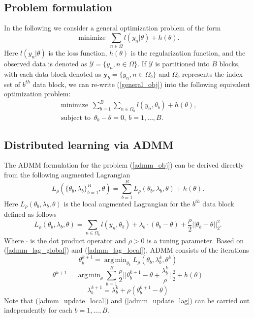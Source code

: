 \documentclass{article}
\DeclareMathOperator*{\argmin}{arg\,min}
\DeclareMathOperator*{\minimize}{minimize}
\DeclareMathOperator*{\st}{subject~to}
\newcommand{\1}[0]{\ensuremath{\boldsymbol{1}}\xspace}
\newcommand{\yv}[0]{\ensuremath{\boldsymbol{y}}\xspace}
\begin{document}
\subsection{Problem formulation}
In the following we consider a general optimization problem of the form
\begin{equation}\label{general_obj}
\minimize ~ \sum_{n\in\Omega}l(y_n|\theta) + h(\theta).
\end{equation}
Here $l(y_n|\theta)$ is the loss function, $h(\theta)$ is the regularization function, and the observed data is denoted as $\mathcal{Y} = \{y_n, n\in\Omega\}$. If $\mathcal{Y}$ is partitioned into $B$ blocks, with each data block denoted as $\yv_b = \{y_n, n \in \Omega_b\}$ and $\Omega_b$ represents the index set of $b^{th}$ data block,  we can re-write (\ref{general_obj}) into the following equivalent optimization problem:
\begin{equation}\label{admm_obj}
\begin{gathered}
\minimize ~ \sum_{b=1}^B\sum_{n\in\Omega_b}l(y_n,\theta_b) + h(\theta),\\
\st ~ \theta_b - \theta = 0, ~ b = 1,\ldots,B.
\end{gathered}
\end{equation}

\subsection{Distributed learning via ADMM}

The ADMM formulation for the problem (\ref{admm_obj}) can be derived directly from the following augmented Lagrangian
\begin{equation}\label{admm_lag_global}
L_\rho(\{\theta_b, \lambda_b\}_{b=1}^B, \theta) =  \sum_{b=1}^BL_\rho(\theta_b, \lambda_b, \theta) + h(\theta).
\end{equation}
Here $L_\rho(\theta_b, \lambda_b, \theta)$ is the local augmented Lagrangian for the $b^{th}$ data block defined as follows
\begin{equation}\label{admm_lag_local}
L_\rho(\theta_b, \lambda_b, \theta)  = \sum_{n\in\Omega_b}l(y_n, \theta_b) + \lambda_b\cdot(\theta_b - \theta) + \frac{\rho}{2}||\theta_b - \theta||_2^2.
\end{equation}
Where $\cdot$ is the dot product operator and $\rho > 0$ is a tuning parameter. Based on (\ref{admm_lag_global}) and (\ref{admm_lag_local}), ADMM consists of the iterations
\begin{equation}\label{admm_update_local}
\theta_b^{k+1} = \argmin_{\theta_b}L_\rho(\theta_b, \lambda_b^k, \theta^k)
\end{equation}
\begin{equation}\label{admm_update_global}
\theta^{k+1} = \argmin_\theta\sum_{b=1}^B\frac{\rho}{2}||\theta_b^{k+1} - \theta + \frac{\lambda_b^k}{\rho}||_2^2 + h(\theta)
\end{equation}
\begin{equation}\label{admm_update_lag}
\lambda_b^{k+1} = \lambda_b^k + \rho(\theta_b^{k+1} - \theta)
\end{equation}
Note that (\ref{admm_update_local}) and (\ref{admm_update_lag}) can be carried out independently for each $b = 1, \ldots, B$.
\end{document}
